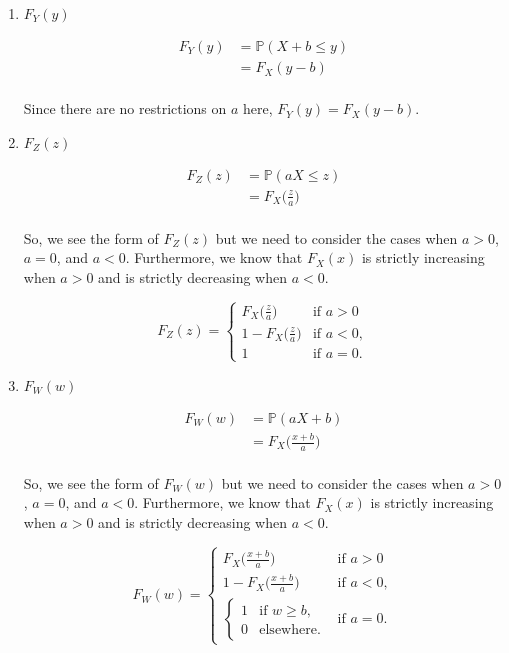\documentclass[12pt]{article}
\begin{document}
\begin{enumerate}[label=(\roman*)]
\item $F_Y(y)$

\noindent
\begin{align*}
F_Y(y) &= \mathbb{P}(X + b \leq y)  \\
&= F_X(y - b) \\
\end{align*}

\noindent
Since there are no restrictions on $a$ here, $F_Y(y) = F_X(y - b)$.

\item $F_Z(z)$

\noindent
\begin{align*}
F_Z(z) &= \mathbb{P}(aX \leq z)  \\
&= F_X \Big (\frac{z}{a} \Big ) \\
\end{align*} 

\noindent
So, we see the form of $F_Z(z)$ but we need to consider the cases when $a > 0$, $a = 0$, and $a < 0$. Furthermore, we know that $F_X(x)$ is strictly increasing when $a > 0$ and is strictly decreasing when $a < 0$.

\[ F_Z(z)=  \begin{cases} 
	  F_X \Big (\frac{z}{a} \Big ) & \text{if } a > 0 \\
      1 - F_X \Big (\frac{z}{a} \Big ) & \text{if } a < 0, \\
      1 & \text{if } a = 0.
      \end{cases} \]

\item $F_W(w)$

\noindent
\begin{align*}
F_W(w) &= \mathbb{P}(aX + b)  \\
&= F_X \Big ( \frac{x+b}{a} \Big ) \\
\end{align*} 


\noindent
So, we see the form of $F_W(w)$ but we need to consider the cases when $a > 0$, $a = 0$, and $a < 0$. Furthermore, we know that $F_X(x)$ is strictly increasing when $a > 0$ and is strictly decreasing when $a < 0$.

\[ F_W(w) = \begin{cases} 
	  F_X \Big ( \frac{x+b}{a} \Big ) & \text{if } a > 0 \\
      1 - F_X \Big ( \frac{x+b}{a} \Big ) & \text{if } a < 0, \\
      
      
      \begin{cases} 
      1 & \text{if } w \geq b, \\
      0 & \text{elsewhere}.
      \end{cases}
      
       & \text{if } a = 0.
      \end{cases} \]
\end{enumerate}
\end{document}
